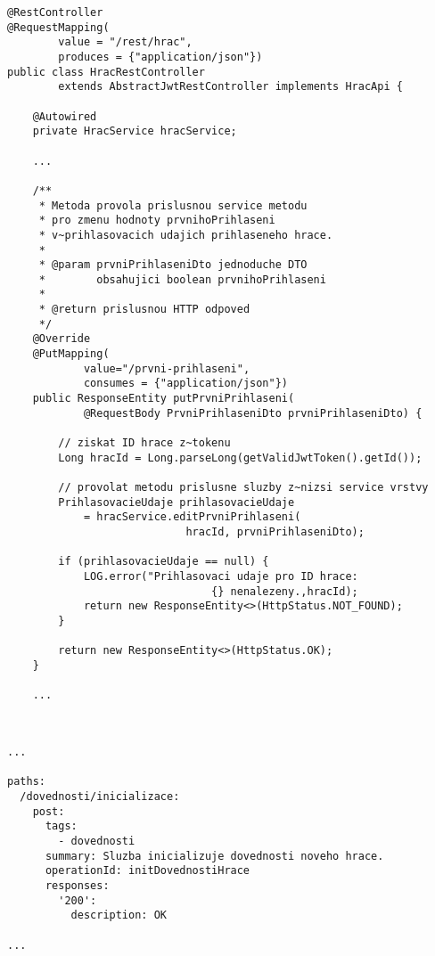 \documentclass[12pt]{article}
\begin{document}
\begin{lstlisting}
@RestController
@RequestMapping(
        value = "/rest/hrac",
        produces = {"application/json"})
public class HracRestController 
        extends AbstractJwtRestController implements HracApi {
    
    @Autowired
    private HracService hracService;
    
    ...
    
    /**
     * Metoda provola prislusnou service metodu
     * pro zmenu hodnoty prvnihoPrihlaseni
     * v~prihlasovacich udajich prihlaseneho hrace.
     *
     * @param prvniPrihlaseniDto jednoduche DTO 
     *        obsahujici boolean prvnihoPrihlaseni
     *                           
     * @return prislusnou HTTP odpoved
     */
    @Override
    @PutMapping(
            value="/prvni-prihlaseni",
            consumes = {"application/json"})
    public ResponseEntity putPrvniPrihlaseni(
            @RequestBody PrvniPrihlaseniDto prvniPrihlaseniDto) {

        // ziskat ID hrace z~tokenu
        Long hracId = Long.parseLong(getValidJwtToken().getId());

        // provolat metodu prislusne sluzby z~nizsi service vrstvy
        PrihlasovacieUdaje prihlasovacieUdaje
            = hracService.editPrvniPrihlaseni(
                            hracId, prvniPrihlaseniDto);

        if (prihlasovacieUdaje == null) {
            LOG.error("Prihlasovaci udaje pro ID hrace:
                                {} nenalezeny.,hracId);
            return new ResponseEntity<>(HttpStatus.NOT_FOUND);
        }

        return new ResponseEntity<>(HttpStatus.OK);
    }
    
    ...
    
\end{lstlisting}



\begin{lstlisting}

...

paths:
  /dovednosti/inicializace:
    post:
      tags:
        - dovednosti
      summary: Sluzba inicializuje dovednosti noveho hrace.
      operationId: initDovednostiHrace
      responses:
        '200':
          description: OK

...

\end{lstlisting}
\end{document}
